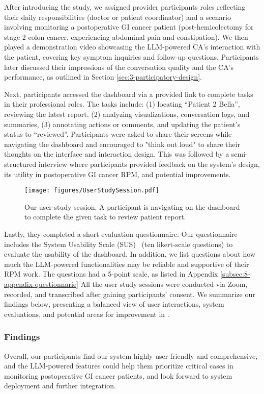 After introducing the study, we assigned provider participants roles reflecting their daily responsibilities (doctor or patient coordinator) and a scenario involving monitoring a postoperative GI cancer patient (post-hemicolectomy for stage 2 colon cancer, experiencing abdominal pain and constipation). We then played a demonstration video showcasing the LLM-powered CA's interaction with the patient, covering key symptom inquiries and follow-up questions. Participants later discussed their impressions of the conversation quality and the CA's performance, as outlined in Section \ref{sec:3-participatory-design}.

Next, participants accessed the \projectname{} dashboard via a provided link to complete tasks in their professional roles. 
The tasks include: (1) locating ``Patient 2 Bella'', reviewing the latest report, (2) analyzing visualizations, conversation logs, and summaries, (3) annotating actions or comments, and updating the patient’s status to ``reviewed''. 
Participants were asked to share their screens while navigating the dashboard and encouraged to "think out loud" to share their thoughts on the interface and interaction design. This was followed by a semi-structured interview where participants provided feedback on the system’s design, its utility in postoperative GI cancer RPM, and potential improvements. 

\begin{figure*}
    \centering
    \texttt{[image: figures/UserStudySession.pdf]}
    \caption{Our user study session. A participant is navigating on the dashboard to complete the given task to review patient report.}
    \label{fig:5-user-study-session}
\end{figure*}


Lastly, they completed a short evaluation questionnaire. Our questionnaire includes the System Usability Scale (SUS)~\cite{Brooke_1995_SUS} (ten likert-scale questions) to evaluate the usability of the dashboard. In addition, we list questions about how much the LLM-powered functionalities may be reliable and supportive of their RPM work. The questions had a 5-point scale, as listed in Appendix \ref{subsec:8-appendix-questionnarie}
All the user study sessions were conducted via Zoom, recorded, and transcribed after gaining participants' consent.
We summarize our findings below, presenting a balanced view of user interactions, system evaluations, and potential areas for improvement in \projectname{}.

\subsubsection{Findings}
Overall, our participants find our system highly user-friendly and comprehensive, and the LLM-powered features could help them prioritize critical cases in monitoring postoperative GI cancer patients, and look forward to system deployment and further integration.

